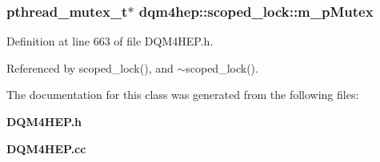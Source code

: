 \subsubsection[{m\+\_\+p\+Mutex}]{\setlength{\rightskip}{0pt plus 5cm}pthread\+\_\+mutex\+\_\+t$\ast$ dqm4hep\+::scoped\+\_\+lock\+::m\+\_\+p\+Mutex\hspace{0.3cm}{\ttfamily [private]}}\label{classdqm4hep_1_1scoped__lock_a5a6f9da10d1ecb308503c920d77fd4e1}


Definition at line 663 of file D\+Q\+M4\+H\+E\+P.\+h.



Referenced by scoped\+\_\+lock(), and $\sim$scoped\+\_\+lock().



The documentation for this class was generated from the following files\+:\begin{DoxyCompactItemize}
\item 
{\bf D\+Q\+M4\+H\+E\+P.\+h}\item 
{\bf D\+Q\+M4\+H\+E\+P.\+cc}\end{DoxyCompactItemize}
